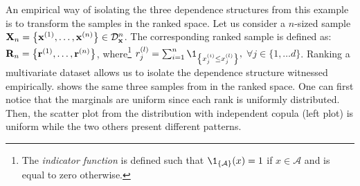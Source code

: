An empirical way of isolating the three dependence structures from this example is to transform the samples in the ranked space. 
Let us consider a $n$-sized sample ${\bf X}_n = \left\{{\bf x}^{(1)}, \dots, {\bf x}^{(n)}\right\} \in \mathcal{D}_{{\bf x}}^{n}$. 
The corresponding ranked sample is defined as: ${\bf R}_n = \left\{{\bf r}^{(1)}, \dots, {\bf r}^{(n)}\right\}$, 
where\footnote{The \textit{indicator function} is defined such that $\1_{\left\{\mathcal{A}\right\}}(x) = 1$ if $x \in \mathcal{A}$ and is equal to zero otherwise.} 
$r^{(l)}_j = \sum_{i=1}^n \1_{\left\{x^{(i)}_j \leq x^{(l)}_j\right\}},$ $\forall j \in \{1, \dots d\}$.
Ranking a multivariate dataset allows us to isolate the dependence structure witnessed empirically. 
 shows the same three samples from  in the ranked space.
One can first notice that the marginals are uniform since each rank is uniformly distributed. 
Then, the scatter plot from the distribution with independent copula (left plot) is uniform while the two others present different patterns. 
